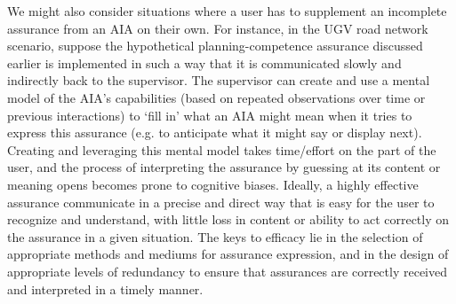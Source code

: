 We might also consider situations where a user has to supplement an incomplete assurance from an AIA on their own. 
For instance, in the UGV road network scenario, suppose the hypothetical planning-competence assurance discussed earlier is implemented in such a way that it is communicated slowly and indirectly back to the supervisor. 
The supervisor can create and use a mental model of the AIA's capabilities (based on repeated observations over time or previous interactions) to `fill in' what an AIA might mean when it tries to express this assurance (e.g. to anticipate what it might say or display next).  
Creating and leveraging this mental model takes time/effort on the part of the user, and the process of interpreting the assurance by guessing at its content or meaning opens becomes prone to cognitive biases. %
Ideally, a highly effective assurance communicate in a precise and direct way that is easy for the user to recognize and understand, with little loss in content or ability to act correctly on the assurance in a given situation. 
The keys to efficacy lie in the selection of appropriate methods and mediums for assurance expression, and in the design of appropriate levels of redundancy to ensure that assurances are correctly received and interpreted in a timely manner.


